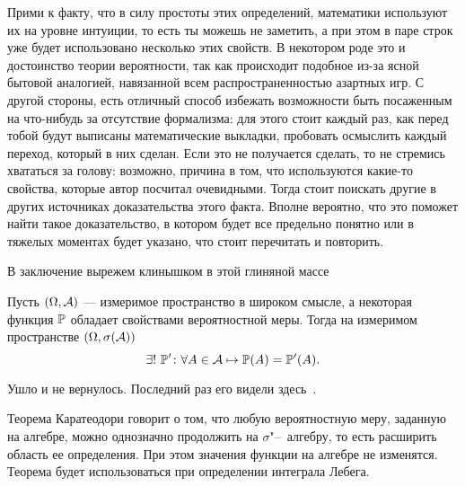 \documentclass[../TV&MS.tex]{subfiles}
\begin{document}
Прими к факту, что в силу простоты этих определений, математики используют их на уровне
интуиции, то есть ты можешь не заметить, а при этом в паре строк уже будет использовано 
несколько этих свойств. В некотором роде это и достоинство теории вероятности, так как
происходит подобное из-за ясной бытовой аналогией, навязанной всем распространенностью
азартных игр. С другой стороны, есть отличный способ избежать возможности быть
посаженным на что-нибудь за отсутствие формализма: для этого стоит каждый раз, как перед тобой
будут выписаны математические выкладки, пробовать осмыслить каждый переход, который
в них сделан. Если это не получается сделать, то не стремись хвататься за голову: возможно,
причина в том, что используются какие-то свойства, которые автор посчитал очевидными.
Тогда стоит поискать другие в других источниках доказательства этого факта. Вполне вероятно,
что это поможет найти такое доказательство, в котором будет все предельно понятно или 
в тяжелых моментах будет указано, что стоит перечитать и повторить.

В заключение вырежем клинышком в этой глиняной массе  

\begin{Th}[Каратеодори]
Пусть $(\Omega, \mathcal{A})$ --- измеримое пространство в широком смысле, 
а некоторая функция $\mathbb{P}$ обладает свойствами вероятностной меры. 
Тогда на измеримом пространстве $(\Omega, \sigma(\mathcal{A}))$
$$
	\exists !\  \mathbb{P}' \colon \forall A \in \mathcal{A} \mapsto \mathbb{P}(A) = \mathbb{P}'(A).
$$
\end{Th}
\begin{Proof}
	Ушло и не вернулось. Последний раз его видели здесь~\cite{Gusev}.
\end{Proof}

\begin{Why}
	Теорема Каратеодори говорит о том, что любую вероятностную меру, 
	заданную на алгебре, можно однозначно продолжить на $\sigma$"--~алгебру, то есть расширить 
	область ее определения. При этом значения функции на алгебре не изменятся. Теорема будет 
	использоваться при определении интеграла Лебега.
\end{Why}
\newpage
\end{document}
